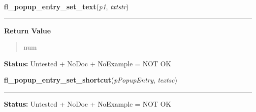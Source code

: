     \label{xformslib:library:fl_popup_entry_set_text}

    \vspace{0.5ex}

\hspace{.8\funcindent}\begin{boxedminipage}{\funcwidth}

    \raggedright \textbf{fl\_popup\_entry\_set\_text}(\textit{p1}, \textit{txtstr})

    \vspace{-1.5ex}

    \rule{\textwidth}{0.5\fboxrule}
\setlength{\parskip}{2ex}
\setlength{\parskip}{1ex}
      \textbf{Return Value}
    \vspace{-1ex}

      \begin{quote}
      num

      \end{quote}

\textbf{Status:} Untested + NoDoc + NoExample = NOT OK



    \end{boxedminipage}

    \label{xformslib:library:fl_popup_entry_set_shortcut}

    \vspace{0.5ex}

\hspace{.8\funcindent}\begin{boxedminipage}{\funcwidth}

    \raggedright \textbf{fl\_popup\_entry\_set\_shortcut}(\textit{pPopupEntry}, \textit{textsc})

    \vspace{-1.5ex}

    \rule{\textwidth}{0.5\fboxrule}
\setlength{\parskip}{2ex}
\setlength{\parskip}{1ex}
\textbf{Status:} Untested + NoDoc + NoExample = NOT OK



    \end{boxedminipage}

    \label{xformslib:library:fl_popup_entry_set_value}


